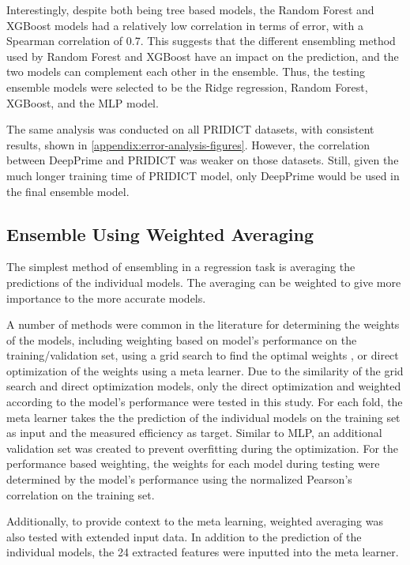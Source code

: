 Interestingly, despite both being tree based models, the Random Forest and XGBoost models had a relatively low correlation in terms of error, with a Spearman correlation of 0.7. This suggests that the different ensembling method used by Random Forest and XGBoost have an impact on the prediction, and the two models can complement each other in the ensemble. Thus, the testing ensemble models were selected to be the Ridge regression, Random Forest, XGBoost, and the MLP model.

The same analysis was conducted on all PRIDICT datasets, with consistent results, shown in \autoref{appendix:error-analysis-figures}. However, the correlation between DeepPrime and PRIDICT was weaker on those datasets. Still, given the much longer training time of PRIDICT model, only DeepPrime would be used in the final ensemble model.


\subsection{Ensemble Using Weighted Averaging}

The simplest method of ensembling in a regression task is averaging the predictions of the individual models. The averaging can be weighted to give more importance to the more accurate models. 

A number of methods were common in the literature for determining the weights of the models, including weighting based on model's performance on the training/validation set\cite{fathiImprovingPrecipitationForecasts2019}, using a grid search to find the optimal weights \cite{anandWeightedAverageEnsemble2023}, or direct optimization of the weights using a meta learner. Due to the similarity of the grid search and direct optimization models, only the direct optimization and weighted according to the model's performance were tested in this study. For each fold, the meta learner takes the the prediction of the individual models on the training set as input and the measured efficiency as target. Similar to MLP, an additional validation set was created to prevent overfitting during the optimization. For the performance based weighting, the weights for each model during testing were determined by the model's performance using the normalized Pearson's correlation on the training set. 

Additionally, to provide context to the meta learning, weighted averaging was also tested with extended input data. In addition to the prediction of the individual models, the 24 extracted features were inputted into the meta learner. 

